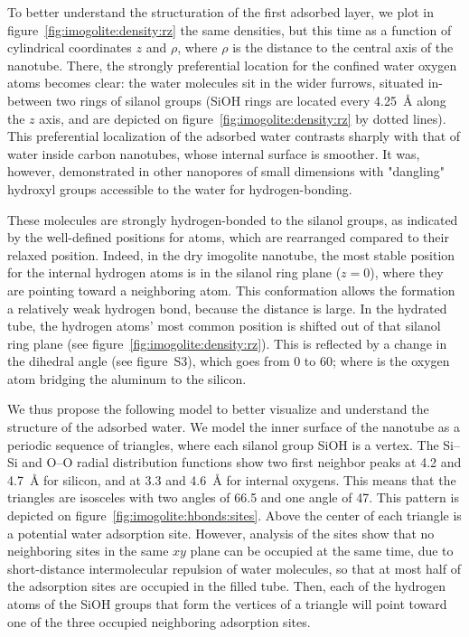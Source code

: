 \documentclass[thesis]{subfiles}
\begin{document}
To better understand the structuration of the first adsorbed layer, we plot in
figure~\ref{fig:imogolite:density:rz} the same densities, but this time as a function of
cylindrical coordinates $z$ and $\rho$, where $\rho$ is the distance to the
central axis of the nanotube. There, the strongly preferential location for the
confined water oxygen atoms becomes clear: the water molecules sit in the wider
furrows, situated in-between two rings of silanol groups (SiOH rings are
located every \SI{4.25}{\AA} along the $z$ axis, and are depicted on
figure~\ref{fig:imogolite:density:rz} by dotted lines). This preferential
localization of the adsorbed water contrasts sharply with that of water inside
carbon nanotubes, whose internal surface is smoother. It was, however,
demonstrated in other nanopores of small dimensions with "dangling" hydroxyl
groups accessible to the water for hydrogen-bonding\cite{Haigis2013}.

These molecules are strongly hydrogen-bonded to the silanol groups, as indicated
by the well-defined positions for  atoms, which are rearranged
compared to their relaxed position. Indeed, in the dry imogolite nanotube, the
most stable position for the internal hydrogen atoms is in the silanol ring
plane ($z = 0$), where they are pointing toward a neighboring  atom.
This conformation allows the formation a relatively weak hydrogen bond, because
the  distance is large. In the hydrated tube,
the hydrogen atoms' most common position is shifted out of that silanol ring
plane (see figure~\ref{fig:imogolite:density:rz}). This is reflected by a change in the
 dihedral angle (see figure~S3), which goes from
0{\textdegree} to 60{\textdegree}; where  is the oxygen atom bridging
the aluminum to the silicon.

We thus propose the following model to better visualize and understand the
structure of the adsorbed water. We model the inner surface of the nanotube as a
periodic sequence of triangles, where each silanol group SiOH is a vertex. The
Si--Si and O--O radial distribution functions show two first neighbor peaks at
4.2 and \SI{4.7}{\AA} for silicon, and at 3.3 and \SI{4.6}{\AA} for internal oxygens.
This means that the triangles are isosceles with two angles of 66.5{\textdegree}
and one angle of 47{\textdegree}. This pattern is depicted on
figure~\ref{fig:imogolite:hbonds:sites}. Above the center of each triangle is a potential water
adsorption site. However, analysis of the sites show that no neighboring sites
in the same $xy$ plane can be occupied at the same time, due to short-distance
intermolecular repulsion of water molecules, so that at most half of the
adsorption sites are occupied in the filled tube. Then, each of the hydrogen
atoms of the SiOH groups that form the vertices of a triangle will point toward
one of the three occupied neighboring adsorption sites.
\end{document}
